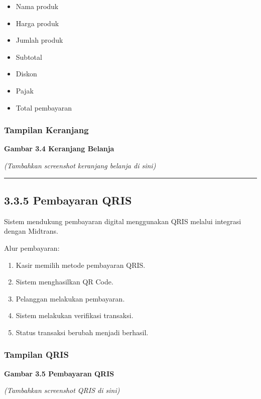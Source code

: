 \begin{itemize}
\tightlist
\item
  Nama produk
\item
  Harga produk
\item
  Jumlah produk
\item
  Subtotal
\item
  Diskon
\item
  Pajak
\item
  Total pembayaran
\end{itemize}

\subsubsection{Tampilan Keranjang}\label{tampilan-keranjang}

\textbf{Gambar 3.4 Keranjang Belanja}

\emph{(Tambahkan screenshot keranjang belanja di sini)}

\begin{center}\rule{0.5\linewidth}{0.5pt}\end{center}

\subsection{3.3.5 Pembayaran QRIS}\label{pembayaran-qris-1}

Sistem mendukung pembayaran digital menggunakan QRIS melalui integrasi dengan Midtrans.

Alur pembayaran:

\begin{enumerate}
\def\labelenumi{\arabic{enumi}.}
\tightlist
\item
  Kasir memilih metode pembayaran QRIS.
\item
  Sistem menghasilkan QR Code.
\item
  Pelanggan melakukan pembayaran.
\item
  Sistem melakukan verifikasi transaksi.
\item
  Status transaksi berubah menjadi berhasil.
\end{enumerate}

\subsubsection{Tampilan QRIS}\label{tampilan-qris}

\textbf{Gambar 3.5 Pembayaran QRIS}

\emph{(Tambahkan screenshot QRIS di sini)}

